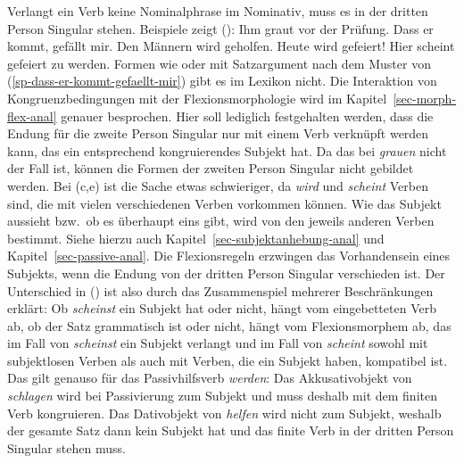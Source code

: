 Verlangt ein Verb keine Nominalphrase im Nominativ, muss es in der dritten Person Singular stehen.
Beispiele zeigt ():
\eal
\ex Ihm graut vor der Prüfung.
\ex\label{sp-dass-er-kommt-gefaellt-mir}
Dass er kommt, gefällt mir.
\ex Den Männern wird geholfen.
\ex Heute wird gefeiert!
\ex Hier scheint gefeiert zu werden.\label{bsp-scheint-gefeiert-zu-werden}
\zl
Formen wie  oder  mit Satzargument nach dem Muster von
(\ref{sp-dass-er-kommt-gefaellt-mir}) gibt es im Lexikon nicht. 
Die Interaktion von Kongruenzbedingungen mit der Flexionsmorphologie wird 
im Kapitel~\ref{sec-morph-flex-anal} genauer besprochen. Hier soll lediglich festgehalten werden,
dass \zb die Endung für die zweite Person Singular nur mit einem Verb verknüpft
werden kann, das ein entsprechend kongruierendes Subjekt hat. Da das bei \emph{grauen} nicht der Fall
ist, können die Formen der zweiten Person Singular nicht gebildet werden.
Bei (c,e) ist die Sache etwas schwieriger, da \emph{wird} und \emph{scheint} Verben sind,
die mit vielen verschiedenen Verben vorkommen können. Wie das Subjekt aussieht bzw.\ ob es überhaupt
eins gibt, wird von den jeweils anderen Verben bestimmt.
Siehe hierzu auch Kapitel~\ref{sec-subjektanhebung-anal} und Kapitel~\ref{sec-passive-anal}.
Die Flexionsregeln erzwingen
das Vorhandensein eines Subjekts, wenn die Endung von der dritten Person Singular verschieden
ist. Der Unterschied in () ist also durch das Zusammenspiel mehrerer Beschränkungen
erklärt: Ob \emph{scheinst} ein Subjekt hat oder nicht, hängt vom eingebetteten Verb ab,
ob der Satz grammatisch ist oder nicht, hängt vom Flexionsmorphem ab, das im Fall
von \emph{scheinst} ein Subjekt verlangt und im Fall von \emph{scheint} sowohl mit
subjektlosen Verben als auch mit Verben, die ein Subjekt haben, kompatibel ist.
\eal
{}
\zl
Das gilt genauso für das Passivhilfsverb \emph{werden}:
\eal\label{bsp-kongruenz-passiv}
\zl
Das Akkusativobjekt von \emph{schlagen} wird bei Passivierung zum
Subjekt und muss deshalb mit dem finiten Verb kongruieren. Das Dativobjekt
von \emph{helfen} wird nicht zum Subjekt, weshalb der gesamte Satz
dann kein Subjekt hat und das finite Verb in der dritten Person Singular
stehen muss.

